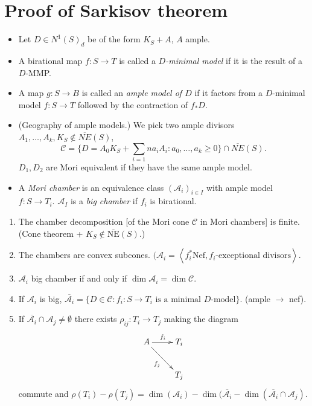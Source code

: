



\section{Proof of Sarkisov theorem}
\label{section-proof-sarkisov}

\begin{itemize}
\item
Let $D \in N^1(S)_d$ be of the form $K_S +
A$, $A$ ample.

\item A birational map $f:S \to T$ is called
a
 {\it $D$-minimal model} if it is the result
 of a $D$-MMP.

\item A map $g:S \to B$ is called an
{\it ample model of $D$} if it factors from a
$D$-minimal model
$f:S \to T$ followed by the contraction of
$f_*D$.

\item (Geography of ample models.)
We pick two ample divisors $A_1,…,A_k, K_S
\not\in \overline{NE}(S)$,
 $$
\mathcal{C}=
\{D=A_0K_S + \sum_{i=1}na_iA_i:
a_0,…,a_k \geq 0\}\cap \overline{NE}(S).
$$
$D_1,D_2$ are Mori equivalent if they have
the same ample model.

\item A {\it Mori chamber} is an equivalence
class
$(\mathcal{A}_i)_{i \in I}$ with ample model
$f:S \to T_i$. $\mathcal{A}_I$ is a {\it big
chamber}
if $f_i$ is birational.
\end{itemize}

\begin{proposition}
\label{proposition-mori-chambers}
\begin{enumerate}
\item The chamber decomposition
[of the Mori cone $\mathcal{C}$ in Mori
chambers]
is finite.
(Cone theorem + $K_S \not\in \overline{
\text{NE}}(S)$.)

\item The chambers are convex subcones.
$(\mathcal{A}_i=
\left\langle{}f_i^*\text{Nef},f_i\text{-exceptional
divisors}\right\rangle{}$.

\item $\mathcal{A}_i$ big chamber if and only
if
\label{item-3}
$\dim \mathcal{A}_i = \dim \mathcal{C}$.

\item If $\mathcal{A}_i$ is big,
$\overline{\mathcal{A}_i}=
\{D \in \mathcal{C}:f_i:S \to T_i\text{ is a
minimal $D$-model}\}$.
(ample $\to$ nef).

\item If
$\overline{\mathcal{A}_i}\cap\mathcal{A}_j
\neq \emptyset$
there exists $\rho_{ij}:T_i \to T_j$ making
the diagram
$$
\xymatrix{
A \ar[r]^{f_i}\ar[dr]_{f_j}&  T_i\\
& T_j
}
$$
commute and $\rho(T_i)-\rho(T_j)
=\dim(\mathcal{A}_i)-
\dim(\overline{\mathcal{A}_i}
-\dim(\overline{\mathcal{A}_i} \cap
\mathcal{A}_j)$.
\end{enumerate}
\end{proposition}



